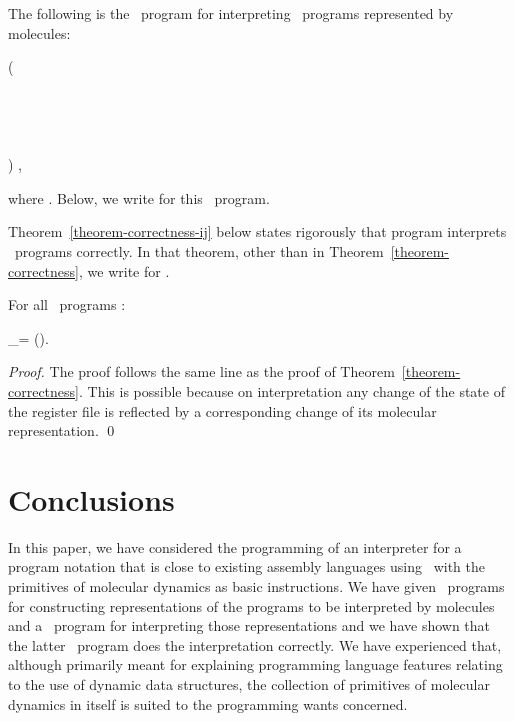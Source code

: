 \documentclass[fleqn]{llncs}
\begin{document}
The following is the \PGA\ program for interpreting \PGLDij\ programs
represented by molecules:
\begin{ldispl}
\begin{aeqns}
( \conc \halt \conc
{} \\ \phantom{(}
  \conc {} \conc
{} \\ \phantom{(}
  \conc {} \conc
{} \\ \phantom{(}
  \conc {} \conc
  \conc {} \conc
   \conc {} \conc
   \conc {} \conc
{} \\ \phantom{(}
  \conc {} \conc
  \conc
  \conc {} \conc
{} \\ \phantom{(}
 ) \rep\;,
\end{aeqns}
\end{ldispl}
where .
Below, we write  for this \PGA\ program.

Theorem~\ref{theorem-correctness-ij} below states rigorously that
program  interprets \PGLDij\ programs correctly.
In that theorem, other than in Theorem~\ref{theorem-correctness}, we
write  for
.
\begin{theorem}
\label{theorem-correctness-ij}
For all \PGLDij\ programs :
\begin{ldispl}
_\sPGLDij =
\abstr()\;.
\end{ldispl}
\end{theorem}
\begin{proof}
The proof follows the same line as the proof of
Theorem~\ref{theorem-correctness}.
This is possible because on interpretation any change of the state of
the register file is reflected by a corresponding change of its
molecular representation.
\qed
\end{proof}

\section{Conclusions}
\label{sect-concl}

In this paper, we have considered the programming of an interpreter for
a program notation that is close to existing assembly languages using
\PGA\ with the primitives of molecular dynamics as basic instructions.
We have given \PGA\ programs for constructing representations of the
programs to be interpreted by molecules and a \PGA\ program for
interpreting those representations and we have shown that the latter
\PGA\ program does the interpretation correctly.
We have experienced that, although primarily meant for explaining
programming language features relating to the use of dynamic data
structures, the collection of primitives of molecular dynamics in itself
is suited to the programming wants concerned.
\end{document}
